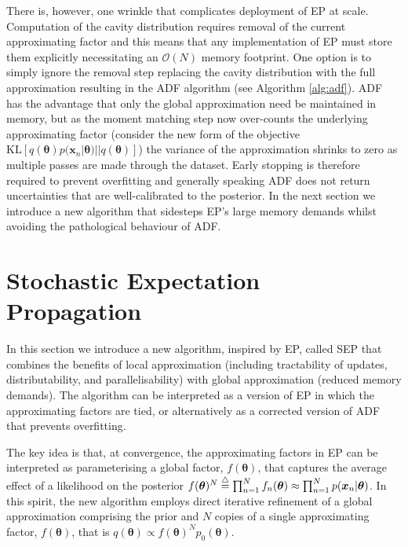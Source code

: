 There is, however, one wrinkle that complicates deployment of EP at scale. Computation of the cavity distribution requires removal of the current approximating factor and this means that any implementation of EP must store them explicitly necessitating an $\mathcal{O}(N)$ memory footprint. One option is to simply ignore the removal step replacing the cavity distribution with the full approximation resulting in the ADF algorithm (see Algorithm \ref{alg:adf}). ADF has the advantage that only the global approximation need be maintained in memory, but as the moment matching step now over-counts the underlying approximating factor (consider the new form of the objective $\mathrm{KL}[q(\bm{\theta}) p(\bm{x}_n | \bm{\theta}) || q(\bm{\theta})]$) the variance of the approximation shrinks to zero as multiple passes are made through the dataset. Early stopping is therefore required to prevent overfitting and generally speaking ADF does not return uncertainties that are well-calibrated to the posterior. 
%
In the next section we introduce a new algorithm that sidesteps EP's large memory demands whilst avoiding the pathological behaviour of ADF. 

\section{Stochastic Expectation Propagation}
%
In this section we introduce a new algorithm, inspired by EP, called SEP that combines the benefits of local approximation (including tractability of updates, distributability, and parallelisability) with global approximation (reduced memory demands).  The algorithm can be interpreted as a version of EP in which the approximating factors are tied, or alternatively as a corrected version of ADF that prevents overfitting. 

The key idea is that, at convergence, the approximating factors in EP can be interpreted as parameterising a global factor,  $f(\bm{\theta})$, that captures the average effect of a likelihood on the posterior  $f(\bm{\theta})^{N} \buildrel\triangle\over = \prod_{n=1}^{N} f_n(\bm{\theta}) \approx \prod_{n=1}^{N} p(\bm{x}_n | \bm{\theta})$. In this spirit, the new algorithm employs direct iterative refinement of a global approximation comprising the prior and $N$ copies of a single approximating factor, $f(\bm{\theta})$, that is $q(\bm{\theta}) \propto f(\bm{\theta})^N p_0(\bm{\theta})$.

